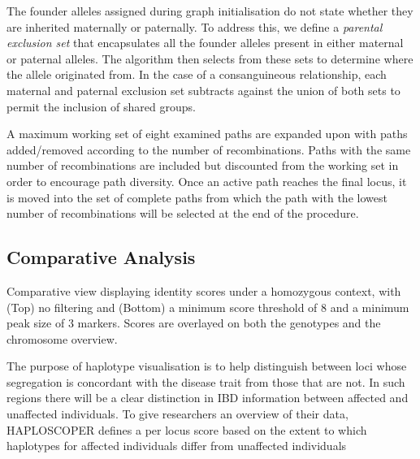 \documentclass{assets/biotemplate/bioinfo}
\numberwithin{equation}{section}
\def\haplo{{HAPLOSCOPER}}            %
\begin{document}
\begin{methods}
The founder alleles assigned during graph initialisation do not state whether they are inherited maternally or paternally. To address this, we define a \textit{parental exclusion set} that encapsulates all the founder alleles present in either maternal or paternal alleles. The algorithm then selects from these sets to determine where the allele originated from. In the case of a consanguineous relationship, each maternal and paternal exclusion set subtracts against the union of both sets to permit the inclusion of shared groups.

A maximum working set of eight examined paths are expanded upon with paths added/removed according to the number of recombinations. Paths with the same number of recombinations are included but discounted from the working set in order to encourage path diversity.
Once an active path reaches the final locus, it is moved into the set of complete paths from which the path with the lowest number of recombinations will be selected at the end of the procedure.








\subsection{Comparative Analysis}

{Comparative view displaying identity scores under a homozygous context, with (Top) no filtering and (Bottom) a minimum score threshold of 8 and a minimum peak size of 3 markers. Scores are overlayed on both the genotypes and the chromosome overview.}

The purpose of haplotype visualisation is to help distinguish between loci whose segregation is concordant with the disease trait from those that are not. In such regions there will be a clear distinction in IBD information between affected and unaffected individuals. To give researchers an overview of their data, \haplo{} defines a per locus score based on the extent to which haplotypes for affected individuals differ from unaffected individuals


\end{methods}
\end{document}
